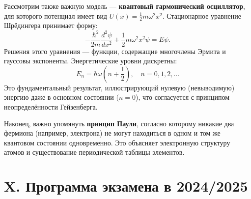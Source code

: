 \documentclass[12pt]{article}
\begin{document}
Рассмотрим также важную модель — \textbf{квантовый гармонический осциллятор}, для которого потенциал имеет вид $U(x) = \frac{1}{2} m \omega^2 x^2$. Стационарное уравнение Шрёдингера принимает форму:
\[
-\frac{\hbar^2}{2m} \frac{d^2 \psi}{dx^2} + \frac{1}{2} m \omega^2 x^2 \psi = E \psi.
\]
Решения этого уравнения — функции, содержащие многочлены Эрмита и гауссовы экспоненты. Энергетические уровни дискретны:
\[
E_n = \hbar \omega \left(n + \frac{1}{2}\right), \quad n = 0, 1, 2, \ldots
\]
Это фундаментальный результат, иллюстрирующий нулевую (невыводимую) энергию даже в основном состоянии ($n = 0$), что согласуется с принципом неопределённости Гейзенберга.

Наконец, важно упомянуть \textbf{принцип Паули}, согласно которому никакие два фермиона (например, электрона) не могут находиться в одном и том же квантовом состоянии одновременно. Это объясняет электронную структуру атомов и существование периодической таблицы элементов.


\clearpage

\section{X. Программа экзамена в 2024/2025}
\end{document}
